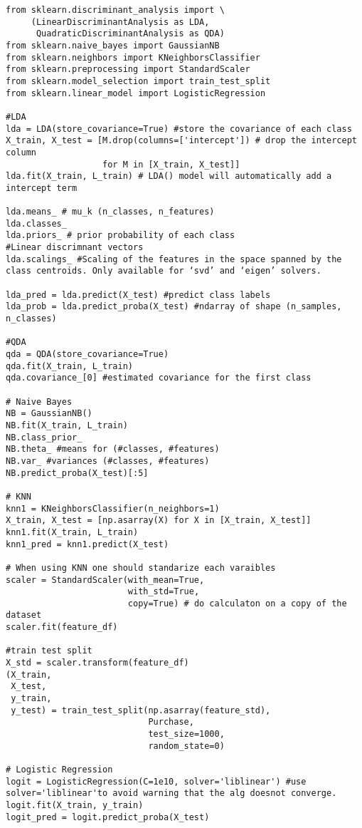 \documentclass[
  letterpaper,
  DIV=11,
  numbers=noendperiod]{scrreprt}
\begin{document}
\begin{verbatim}
from sklearn.discriminant_analysis import \
     (LinearDiscriminantAnalysis as LDA,
      QuadraticDiscriminantAnalysis as QDA)
from sklearn.naive_bayes import GaussianNB
from sklearn.neighbors import KNeighborsClassifier
from sklearn.preprocessing import StandardScaler
from sklearn.model_selection import train_test_split
from sklearn.linear_model import LogisticRegression

#LDA
lda = LDA(store_covariance=True) #store the covariance of each class
X_train, X_test = [M.drop(columns=['intercept']) # drop the intercept column
                   for M in [X_train, X_test]]
lda.fit(X_train, L_train) # LDA() model will automatically add a intercept term

lda.means_ # mu_k (n_classes, n_features)
lda.classes_
lda.priors_ # prior probability of each class
#Linear discrimnant vectors
lda.scalings_ #Scaling of the features in the space spanned by the class centroids. Only available for ‘svd’ and ‘eigen’ solvers.

lda_pred = lda.predict(X_test) #predict class labels
lda_prob = lda.predict_proba(X_test) #ndarray of shape (n_samples, n_classes)

#QDA
qda = QDA(store_covariance=True)
qda.fit(X_train, L_train)
qda.covariance_[0] #estimated covariance for the first class

# Naive Bayes
NB = GaussianNB()
NB.fit(X_train, L_train)
NB.class_prior_
NB.theta_ #means for (#classes, #features)
NB.var_ #variances (#classes, #features)
NB.predict_proba(X_test)[:5]

# KNN
knn1 = KNeighborsClassifier(n_neighbors=1)
X_train, X_test = [np.asarray(X) for X in [X_train, X_test]]
knn1.fit(X_train, L_train)
knn1_pred = knn1.predict(X_test)

# When using KNN one should standarize each varaibles
scaler = StandardScaler(with_mean=True,
                        with_std=True,
                        copy=True) # do calculaton on a copy of the dataset
scaler.fit(feature_df)

#train test split
X_std = scaler.transform(feature_df)
(X_train,
 X_test,
 y_train,
 y_test) = train_test_split(np.asarray(feature_std),
                            Purchase,
                            test_size=1000,
                            random_state=0)

# Logistic Regression
logit = LogisticRegression(C=1e10, solver='liblinear') #use solver='liblinear'to avoid warning that the alg doesnot converge.  
logit.fit(X_train, y_train)
logit_pred = logit.predict_proba(X_test)

\end{verbatim}
\end{document}
